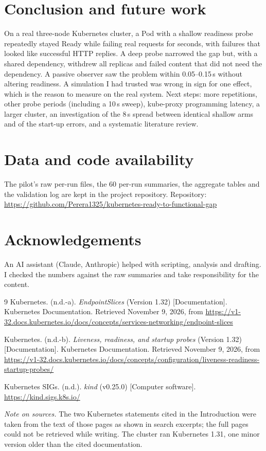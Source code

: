 \documentclass[11pt,a4paper]{article}
\begin{document}
\section{Conclusion and future work}
On a real three-node Kubernetes cluster, a Pod with a shallow readiness probe repeatedly stayed Ready while failing real requests for seconds, with failures that looked like successful HTTP replies. A deep probe narrowed the gap but, with a shared dependency, withdrew all replicas and failed content that did not need the dependency. A passive observer saw the problem within 0.05--0.15\,s without altering readiness. A simulation I had trusted was wrong in sign for one effect, which is the reason to measure on the real system. Next steps: more repetitions, other probe periods (including a 10\,s sweep), kube-proxy programming latency, a larger cluster, an investigation of the 8\,s spread between identical shallow arms and of the start-up errors, and a systematic literature review.

\section*{Data and code availability}
The pilot's raw per-run files, the 60 per-run summaries, the aggregate tables and the validation log are kept in the project repository. Repository: \url{https://github.com/Perera1325/kubernetes-ready-to-functional-gap}

\section*{Acknowledgements}
An AI assistant (Claude, Anthropic) helped with scripting, analysis and drafting. I checked the numbers against the raw summaries and take responsibility for the content.

\begin{thebibliography}{9}\small
{}
Kubernetes. (n.d.-a). \emph{EndpointSlices} (Version 1.32) [Documentation]. Kubernetes Documentation. Retrieved November 9, 2026, from \url{https://v1-32.docs.kubernetes.io/docs/concepts/services-networking/endpoint-slices}

Kubernetes. (n.d.-b). \emph{Liveness, readiness, and startup probes} (Version 1.32) [Documentation]. Kubernetes Documentation. Retrieved November 9, 2026, from \url{https://v1-32.docs.kubernetes.io/docs/concepts/configuration/liveness-readiness-startup-probes/}

Kubernetes SIGs. (n.d.). \emph{kind} (v0.25.0) [Computer software]. \url{https://kind.sigs.k8s.io/}
\end{thebibliography}
{\footnotesize\textit{Note on sources.} The two Kubernetes statements cited in the Introduction were taken from the text of those pages as shown in search excerpts; the full pages could not be retrieved while writing. The cluster ran Kubernetes 1.31, one minor version older than the cited documentation.}
\end{document}
